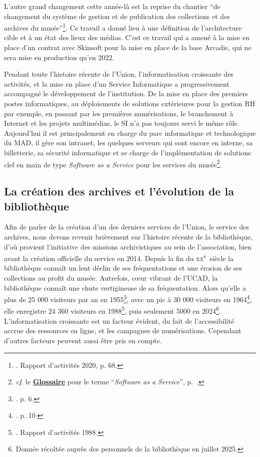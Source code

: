 L'autre grand changement cette année-là est la reprise du chantier \enquote{de changement du système de gestion et de publication des collections et des archives du musée}\footnote{\cite{noauthor__1982}. Rapport d'activités 2020, p. 68.}. Ce travail a donné lieu à une définition de l'architecture cible et à un état des lieux des médias. C'est ce travail qui a amené à la mise en place d'un contrat avec Skinsoft pour la mise en place de la base Arcadie, qui ne sera mise en production qu'en 2022.

Pendant toute l'histoire récente de l'Union, l'informatisation croissante des activités, et la mise en place d'un Service Informatique a progressivement accompagné le développement de l'institution. De la mise en place des premiers postes informatiques, au déploiements de solutions extérieures pour la gestion RH par exemple, en passant par les premières numérisations, le branchement à Internet et les projets multimédias, le SI n'a pas toujours servi le même rôle. Aujourd'hui il est principalement en charge du parc informatique et technologique du MAD, il gère son intranet, les quelques serveurs qui sont encore en interne, sa billetterie, sa sécurité informatique et se charge de l'implémentation de solutions clef en main de type \textit{Software as a Service} pour les services du musée\footnote{\textit{cf}. le \textbf{\hyperref[sec:Glossaire]{Glossaire}} pour le terme \enquote{\textit{Software as a Service}}, p.~\pageref{sec:Glossaire}.}. 

\subsection{La création des archives et l'évolution de la bibliothèque}

Afin de parler de la création d'un des derniers services de l'Union, le service des archives, nous devons revenir brièvement sur l'histoire récente de la bibliothèque, d'où provient l'initiative des missions archivistiques au sein de l'association, bien avant la création officielle du service en 2014. Depuis la fin du \textsc{xx}\textsuperscript{e}~siècle la bibliothèque connaît un lent déclin de ses fréquentations et une érosion de ses collections au profit du musée. Autrefois, cœur vibrant de l'UCAD, la bibliothèque connaît une chute vertigineuse de sa fréquentation. Alors qu'elle a plus de 25 000 visiteurs par an en 1955\footnote{\cite{noauthor__1955}. p. 6.}, avec un pic à 30 000 visiteurs en 1964\footnote{\cite{noauthor__1965}. p. 10.}, elle enregistre 24 360 visiteurs en 1988\footnote{\cite{noauthor__1982}. Rapport d'activités 1988.}, puis seulement 5000 en 2024\footnote{Donnée récoltée auprès des personnels de la bibliothèque en juillet 2025.}. L'informatisation croissante est un facteur évident, du fait de l'accessibilité accrue des ressources en ligne, et les campagnes de numérisations. Cependant d'autres facteurs peuvent aussi être pris en compte. 

